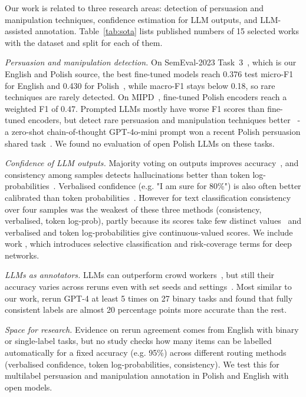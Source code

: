 \documentclass[11pt]{article}
\begin{document}
\begin{enumerate}
Our work is related to three research areas: detection of persuasion and manipulation techniques,
confidence estimation for LLM outputs, and LLM-assisted annotation.
Table~\ref{tab:sota} lists published numbers of 15 selected works with the dataset and split for each of them.

\textit{Persuasion and manipulation detection.}
On SemEval-2023 Task~3~\cite{piskorski-etal-2023-semeval}, which is our English and Polish source, the best fine-tuned models
reach 0.376 test micro-F1 for English and 0.430 for Polish~\cite{purificato-navigli-2023-apatt,hromadka-etal-2023-kinitveraai},
while macro-F1 stays below 0.18, so rare techniques are rarely detected.
On MIPD~\cite{modzelewski-etal-2024-mipd}, fine-tuned Polish encoders reach a weighted F1 of 0.47.
Prompted LLMs mostly have worse F1 scores than fine-tuned encoders, but detect rare persuasion and manipulation techniques better~\cite{hasanain-etal-2024-gpt} -
a zero-shot chain-of-thought GPT-4o-mini prompt won a recent Polish persuasion shared task~\cite{jose-greenstadt-2025-llms}.
We found no evaluation of open Polish LLMs on these tasks.

\textit{Confidence of LLM outputs.}
Majority voting on outputs improves accuracy~\cite{wang2023selfconsistency},
and consistency among samples detects hallucinations better than token log-probabilities~\cite{manakul-etal-2023-selfcheckgpt}.
Verbalised confidence (e.g. "I am sure for 80\%") is also often better calibrated than token probabilities~\cite{tian-etal-2023-just}.
However for text classification consistency over four samples was the weakest of these three methods (consistency, verbalised, token log-prob),
partly because its scores take few distinct values~\cite{merdjanovska-etal-2026-evaluation} and verbalised and token log-probabilities give continuous-valued scores.
We include work , which introduces selective classification and risk-coverage terms for deep networks.

\textit{LLMs as annotators.}
LLMs can outperform crowd workers~\cite{gilardi2023chatgpt},
but still their accuracy varies across reruns even with set seeds and settings~\cite{atil-etal-2025-non}.
Most similar to our work,  rerun GPT-4 at least 5 times on 27 binary tasks
and found that fully consistent labels are almost 20 percentage points more accurate than the rest.

\textit{Space for research.}
Evidence on rerun agreement comes from English with binary or single-label tasks,
but no study checks how many items can be labelled automatically for a fixed accuracy (e.g. 95\%) across different routing methods (verbalised confidence, token log-probabilities, consistency).
We test this for multilabel persuasion and manipulation annotation in Polish and English with open models.




\end{enumerate}
\end{document}
